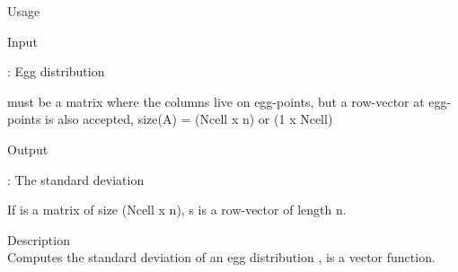 {

\begin{tdesc}
\item[Usage] 
\item[Input]
  \begin{vartab}
      \> : \> Egg distribution  \>  [eggs/m$^3$]
  \end{vartab}
   must be a matrix where the columns live on egg-points,
  but a row-vector at egg-points is also accepted,
  size(A) = (Ncell x n) or (1 x Ncell)
\item[Output]
  \begin{vartab}
     \>  : \> The standard deviation  \> [m]
  \end{vartab}
  If  is a matrix of size (Ncell x n), s is a
  row-vector of length n.
\item[Description]\mbox{}\\
  Computes the standard deviation of an egg 
  distribution ,
   is a vector function.
\end{tdesc}


} %

